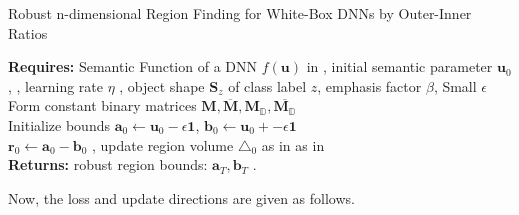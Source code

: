 \begin{algorithm}[h] 
\caption{Robust n-dimensional Region Finding for White-Box DNNs by Outer-Inner Ratios}\label{alg: white}
\small
\SetAlgoLined
  \textbf{Requires: }  Semantic Function of a DNN $f(\mathbf{u})$ in \eqLabel{\ref{eq:f}}, initial semantic parameter $\mathbf{u}_{0}$, , learning rate $\eta$ , object shape $\mathbf{S}_{z}$ of class label $z$, emphasis factor $\beta$, Small $\epsilon$ \\
   Form constant binary matrices $\mathbf{M}, \overline{\mathbf{M}}, \mathbf{M}_{\mathbb{D}},\overline{\mathbf{M}_{\mathbb{D}}} $ \\
   Initialize bounds $\mathbf{a}_{0}\leftarrow \mathbf{u}_{0} - \epsilon \mathbf{1} $, $\mathbf{b}_{0} \leftarrow \mathbf{u}_{0}+- \epsilon \mathbf{1}$ \\
    $\mathbf{r}_{0} \leftarrow \mathbf{a}_{0}-\mathbf{b}_{0} $ , update region volume $ \triangle_{0} $ as in as in \eqLabel{\ref{eq:n-vol}}\\
    \textbf{Returns: }robust region bounds: $ \mathbf{a}_{T},\mathbf{b}_{T}$ .
\end{algorithm}
Now, the loss and update directions are given as follows.
